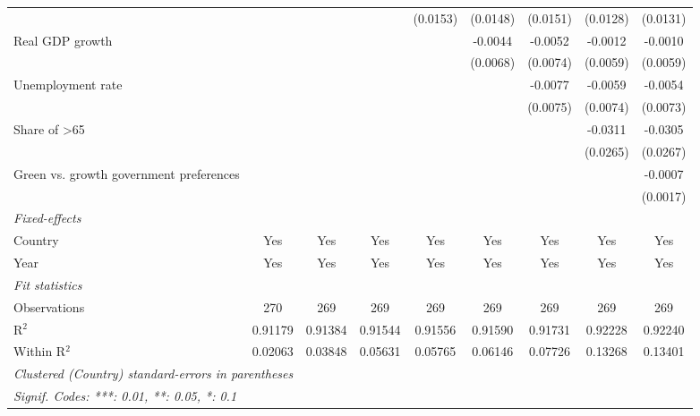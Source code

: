 \begin{table}[htbp]
\begin{tabular}{lcccccccc}
                                                      &                &                &          & (0.0153) & (0.0148) & (0.0151) & (0.0128) & (0.0131)\\   
      Real GDP growth                                 &                &                &          &          & -0.0044  & -0.0052  & -0.0012  & -0.0010\\   
                                                      &                &                &          &          & (0.0068) & (0.0074) & (0.0059) & (0.0059)\\   
      Unemployment rate                               &                &                &          &          &          & -0.0077  & -0.0059  & -0.0054\\   
                                                      &                &                &          &          &          & (0.0075) & (0.0074) & (0.0073)\\   
      Share of >65                                    &                &                &          &          &          &          & -0.0311  & -0.0305\\   
                                                      &                &                &          &          &          &          & (0.0265) & (0.0267)\\   
      Green vs. growth government preferences         &                &                &          &          &          &          &          & -0.0007\\   
                                                      &                &                &          &          &          &          &          & (0.0017)\\   
      \midrule
      \emph{Fixed-effects}\\
      Country                                         & Yes            & Yes            & Yes      & Yes      & Yes      & Yes      & Yes      & Yes\\  
      Year                                            & Yes            & Yes            & Yes      & Yes      & Yes      & Yes      & Yes      & Yes\\  
      \midrule
      \emph{Fit statistics}\\
      Observations                                    & 270            & 269            & 269      & 269      & 269      & 269      & 269      & 269\\  
      R$^2$                                           & 0.91179        & 0.91384        & 0.91544  & 0.91556  & 0.91590  & 0.91731  & 0.92228  & 0.92240\\  
      Within R$^2$                                    & 0.02063        & 0.03848        & 0.05631  & 0.05765  & 0.06146  & 0.07726  & 0.13268  & 0.13401\\  
      \midrule \midrule
      \multicolumn{9}{l}{\emph{Clustered (Country) standard-errors in parentheses}}\\
      \multicolumn{9}{l}{\emph{Signif. Codes: ***: 0.01, **: 0.05, *: 0.1}}\\
   \end{tabular}
\end{table}


